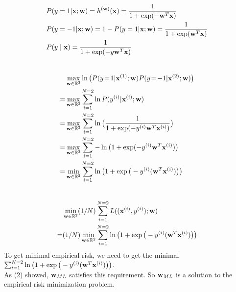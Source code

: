 \documentclass[article,11pt]{article}
\begin{document}
\begin{equation}
\begin{aligned}
& P(y=1|{\bf x};{\bf w}) = h^{({\bf w})}({\bf x})=\frac{1}{1+\exp(-{\bf w}^{T}{\bf x})} \\
&
P(y=-1|{\bf x};{\bf w}) = 1- P(y=1|{\bf x};{\bf w}) =\frac{1}{1+\exp({\bf w}^{T}{\bf x})}	\\
&
P(y \mid {\bf x})= \frac{1}{1+\exp(-y{\bf w}^{T}{\bf x})} \\
\end{aligned}
\end{equation}
\\
\begin{equation}
\begin{aligned}
& \max_{{\bf w} \in \mathbb{R}^{2}} \ln\big(P(y\!=\!1|{\bf x}^{(1)};{\bf w}) P(y\!=\!-1|{\bf x}^{(2)};{\bf w})\big)  \\
= &
\max_{{\bf w} \in \mathbb{R}^{2}}\sum_{i=1}^{N=2}\ln P(y^{(i)}|{\bf x}^{(i)};{\bf w})  \\
= &
\max_{{\bf w} \in \mathbb{R}^{2}}\sum_{i=1}^{N=2}\ln \big( \frac{1}{1+\exp(-y^{(i)}{\bf w}^{T}{\bf x}^{(i)})} \big)\\
= & \max_{{\bf w} \in \mathbb{R}^{2}}\sum_{i=1}^{N=2}-\ln \big( 1+\exp(-y^{(i)}{\bf w}^{T}{\bf x}^{(i)}) \big) \\
= &
\min\limits_{{\bf w} \in \mathbb{R}^{2}} \sum_{i=1}^{N=2} 
\ln\big(1 + \exp\big(- y^{(i)} ({\bf w}^{T} {\bf x}^{(i)})\big)\big) 
\end{aligned}
\end{equation}
\\
\begin{equation}
\begin{aligned}
&\min\limits_{{\bf w} \in \mathbb{R}^{2}}(1/N) \sum_{i=1}^{N=2} L(({\bf x}^{(i)},y^{(i)}); {\bf w}) \\
=&
(1/N)\min\limits_{{\bf w} \in \mathbb{R}^{2}} \sum_{i=1}^{N=2} 
\ln\big(1 + \exp\big(- y^{(i)} ({\bf w}^{T} {\bf x}^{(i)})\big)\big) \\
\end{aligned}
\end{equation}
To get minimal empirical risk, we need to get the minimal $\sum_{i=1}^{N=2} 
\ln\big(1 + \exp\big(- y^{(i)} ({\bf w}^{T} {\bf x}^{(i)})\big)\big)$.  
\\
As (2) showed, ${\bf w}_{ML}$ satisfies this requirement. So ${\bf w}_{ML}$ is a solution to the empirical risk minimization problem.

\newpage
\end{document}
